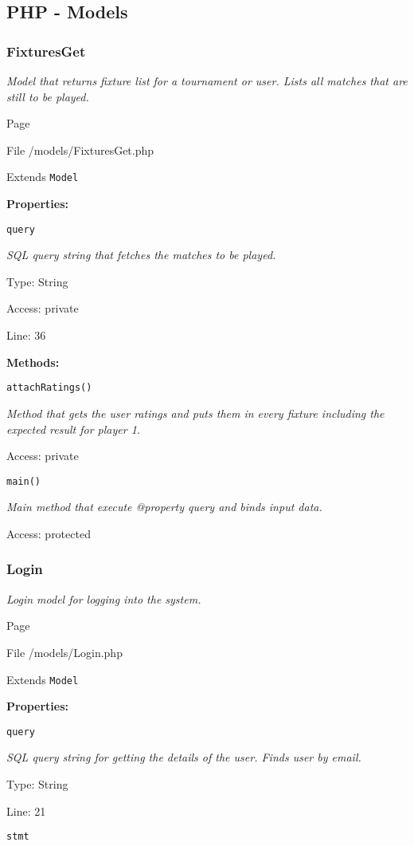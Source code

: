 \subsection{PHP - Models}
\subsubsection{FixturesGet}
\textit{Model that returns fixture list for a tournament or user.
Lists all matches that are still to be played.}

Page \pageref{FixturesGet.php}

File /models/FixturesGet.php

Extends \texttt{Model}

\textbf{Properties:}

\texttt{query}

{\scriptsize
\textit{SQL query string that fetches the matches to be played.}

Type: String

Access: private

Line: 36

}
\textbf{Methods:}

\texttt{attachRatings()}

{\scriptsize
\textit{Method that gets the user ratings and puts them in every fixture including the expected result for player 1.}

Access: private

}

\texttt{main()}

{\scriptsize
\textit{Main method that execute @property query and binds input data.}

Access: protected

}

\subsubsection{Login}
\textit{Login model for logging into the system.}

Page \pageref{Login.php}

File /models/Login.php

Extends \texttt{Model}

\textbf{Properties:}

\texttt{query}

{\scriptsize
\textit{SQL query string for getting the details of the user.
Finds user by email.}

Type: String

Line: 21

}
\texttt{stmt}

